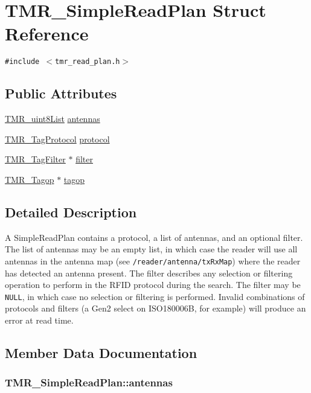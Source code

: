 \hypertarget{struct_t_m_r___simple_read_plan}{
\section{TMR\_\-SimpleReadPlan Struct Reference}
\label{struct_t_m_r___simple_read_plan}
}
{\tt \#include $<$tmr\_\-read\_\-plan.h$>$}

\subsection*{Public Attributes}
\begin{CompactItemize}
\item 
\hyperlink{struct_t_m_r__uint8_list}{TMR\_\-uint8List} \hyperlink{struct_t_m_r___simple_read_plan_274341bf4de71f8af7a13853b1746e09}{antennas}
\item 
\hyperlink{tmr__tag__protocol_8h_1e727f69e94ccc81da4d3b9440aba934}{TMR\_\-TagProtocol} \hyperlink{struct_t_m_r___simple_read_plan_4424d5594191b662906994722634e396}{protocol}
\item 
\hyperlink{struct_t_m_r___tag_filter}{TMR\_\-TagFilter} $\ast$ \hyperlink{struct_t_m_r___simple_read_plan_135d9dab041c7374db67782cd1f9534d}{filter}
\item 
\hyperlink{struct_t_m_r___tagop}{TMR\_\-Tagop} $\ast$ \hyperlink{struct_t_m_r___simple_read_plan_5991aff42b10948935a77b593b473016}{tagop}
\end{CompactItemize}


\subsection{Detailed Description}
A SimpleReadPlan contains a protocol, a list of antennas, and an optional filter. The list of antennas may be an empty list, in which case the reader will use all antennas in the antenna map (see {\tt /reader/antenna/txRxMap}) where the reader has detected an antenna present. The filter describes any selection or filtering operation to perform in the RFID protocol during the search. The filter may be {\tt NULL}, in which case no selection or filtering is performed. Invalid combinations of protocols and filters (a Gen2 select on ISO180006B, for example) will produce an error at read time. 

\subsection{Member Data Documentation}
\hypertarget{struct_t_m_r___simple_read_plan_274341bf4de71f8af7a13853b1746e09}{
\subsubsection[{antennas}]{ {\bf TMR\_\-SimpleReadPlan::antennas}}}
\label{struct_t_m_r___simple_read_plan_274341bf4de71f8af7a13853b1746e09}


